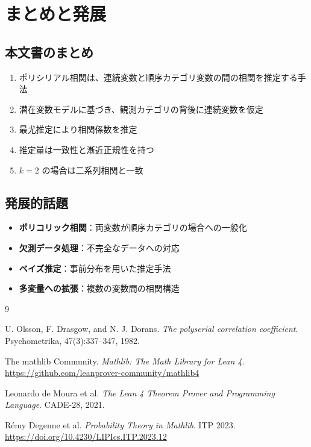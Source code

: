 \documentclass[a4paper,11pt]{ltjsarticle}
\theoremstyle{definition}
\theoremstyle{plain}
\theoremstyle{remark}
\begin{document}
\section{まとめと発展}

\subsection{本文書のまとめ}

\begin{enumerate}
    \item ポリシリアル相関は、連続変数と順序カテゴリ変数の間の相関を推定する手法
    \item 潜在変数モデルに基づき、観測カテゴリの背後に連続変数を仮定
    \item 最尤推定により相関係数を推定
    \item 推定量は一致性と漸近正規性を持つ
    \item $k = 2$ の場合は二系列相関と一致
\end{enumerate}

\subsection{発展的話題}

\begin{itemize}
    \item \textbf{ポリコリック相関}：両変数が順序カテゴリの場合への一般化
    \item \textbf{欠測データ処理}：不完全なデータへの対応
    \item \textbf{ベイズ推定}：事前分布を用いた推定手法
    \item \textbf{多変量への拡張}：複数の変数間の相関構造
\end{itemize}


\begin{thebibliography}{9}

U. Olsson, F. Drasgow, and N. J. Dorans.
\textit{The polyserial correlation coefficient}.
Psychometrika, 47(3):337--347, 1982.

The mathlib Community.
\textit{Mathlib: The Math Library for Lean 4}.
\url{https://github.com/leanprover-community/mathlib4}

Leonardo de Moura et al.
\textit{The Lean 4 Theorem Prover and Programming Language}.
CADE-28, 2021.

Rémy Degenne et al.
\textit{Probability Theory in Mathlib}.
ITP 2023.
\url{https://doi.org/10.4230/LIPIcs.ITP.2023.12}

\end{thebibliography}
\end{document}
